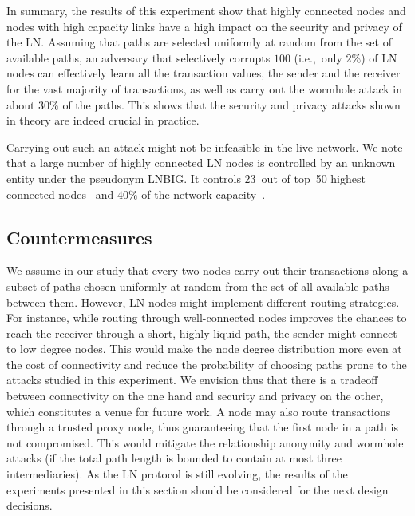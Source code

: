 In summary, 
the results of this experiment show that highly connected nodes and nodes with high capacity links have a high impact on the security and privacy of the LN.
Assuming that paths are selected uniformly at random from the set of available paths, 
an adversary that selectively corrupts $100$ (i.e.,~only $2\%$) 
of LN nodes can effectively learn all the transaction values, 
the sender and the receiver for the vast majority of transactions, 
as well as carry out the wormhole attack in about $30\%$ of the paths. 
This shows that the security and privacy attacks shown in theory are indeed crucial in practice. 

Carrying out such an attack might not be infeasible in the live network. We 
note that a large number of highly connected LN nodes is controlled by an unknown entity under the pseudonym LNBIG.
It controls 23~out of top~50 highest connected nodes~\cite{1MLTopConnected} and $40\%$ of the network capacity~\cite{TheBlockLNBIG}.

\subsection{Countermeasures}
We assume in our study that every two nodes carry out their transactions  
along a subset of paths chosen uniformly at random from the set of all available paths between them. 
However, LN nodes might implement different routing strategies. 
For instance, while routing through well-connected nodes improves the chances to reach the receiver through a short, highly liquid path, 
the sender might connect to low degree nodes.
This would make the node degree distribution more even at the cost of connectivity and reduce the probability of choosing paths prone to the 
attacks studied in this experiment. 
We envision thus that there is a tradeoff between connectivity on the one hand and security and privacy on the other,
which constitutes a venue for future work.
A node may also route transactions through a trusted proxy node, 
thus guaranteeing that the first node in a path is not compromised.
This would mitigate the relationship anonymity and wormhole attacks (if the total path length is bounded to contain at most three intermediaries).
As the LN protocol is still evolving, the results of the experiments presented in this section should be considered 
for the next design decisions.

